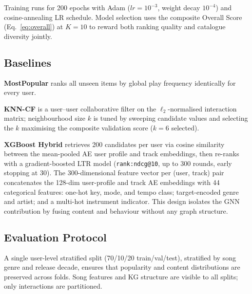 Training runs for 200 epochs with Adam ($lr{=}10^{-3}$, weight decay $10^{-4}$) and cosine-annealing LR schedule. Model selection uses the composite Overall Score (Eq.~\ref{eq:overall}) at $K{=}10$ to reward both ranking quality and catalogue diversity jointly.

\subsection{Baselines}

\textbf{MostPopular} ranks all unseen items by global play frequency identically for every user.

\textbf{KNN-CF} is a user--user collaborative filter on the $\ell_2$-normalised interaction matrix; neighbourhood size $k$ is tuned by sweeping candidate values and selecting the $k$ maximising the composite validation score ($k{=}6$ selected).

\textbf{XGBoost Hybrid} retrieves 200 candidates per user via cosine similarity between the mean-pooled AE user profile and track embeddings, then re-ranks with a gradient-boosted LTR model (\texttt{rank:ndcg@10}, up to 300 rounds, early stopping at 30). The 300-dimensional feature vector per (user, track) pair concatenates the 128-dim user-profile and track AE embeddings with 44 categorical features: one-hot key, mode, and tempo class; target-encoded genre and artist; and a multi-hot instrument indicator. This design isolates the GNN contribution by fusing content and behaviour without any graph structure.

\subsection{Evaluation Protocol}

A single user-level stratified split (70/10/20 train/val/test), stratified by song genre and release decade, ensures that popularity and content distributions are preserved across folds. Song features and KG structure are visible to all splits; only interactions are partitioned.

